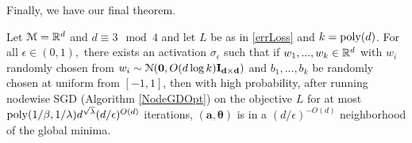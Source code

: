Finally, we have our final theorem.

\begin{theorem}\label{nodewise}
Let $\mathcal{M} = {\mathbb{R}}^{d}$ and $d \equiv 3 \mod 4$ and let $L$ be as in \ref{errLoss} and $k = \mathrm{poly}(d)$. For all $\epsilon \in (0,1),$ there exists an activation $\sigma_\epsilon$ such that if $w_1,...,w_k \in {\mathbb{R}}^d$ with $w_i$ randomly chosen from $w_i \sim  \mathcal{N}({\bf 0}, O(d\log k){\bf I_{d\times d}})$ and $b_1,...,b_k$ be randomly chosen at uniform from $[-1,1]$, then with high probability, after running nodewise SGD (Algorithm \ref{NodeGDOpt}) on the objective $L$ for at most $\mathrm{poly}(1/\beta,1/\lambda)d^{\sqrt{\lambda}}(d/\epsilon)^{O(d)}$ iterations, $\boldsymbol{(a,\theta)}$ is in a $(d/\epsilon)^{-O(d)}$ neighborhood of the global minima.
\end{theorem}

